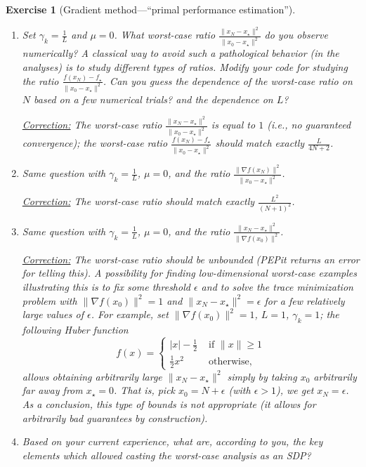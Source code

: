 \documentclass[11pt,a4paper]{article}
\newcommand{\pepit}{{PEPit }}
\newcommand{\correction}[1]{{{\color{blue}\underline{Correction:} #1}}}
\newcommand{\correction}[1]{}
\newtheorem{exercise}{Exercise}
\begin{document}
\begin{exercise}[Gradient method---``primal performance estimation'']
\begin{enumerate}
	\item Set $\gamma_k=\tfrac{1}{L}$ and $\mu=0$. What worst-case ratio $\frac{\|x_{N}-x_\star\|^2}{\|x_0-x_\star\|^2}$ do you observe numerically? A classical way to avoid such a pathological behavior  (in the analyses) is to study different types of ratios. Modify your code for studying the ratio $\frac{f(x_N)-f_\star}{\|x_0-x_\star\|^2}$. Can you guess the dependence of the worst-case ratio on $N$ based on a few numerical trials? and the dependence on $L$?
	
	\correction{The worst-case ratio $\frac{\|x_{N}-x_\star\|^2}{\|x_0-x_\star\|^2}$ is equal to $1$ (i.e., no guaranteed convergence); the worst-case ratio $\frac{f(x_N)-f_\star}{\|x_0-x_\star\|^2}$ should match exactly $\frac{L}{4N+2}$.}
	
	
	\item Same question with $\gamma_k=\tfrac{1}{L}$, $\mu=0$, and the ratio $\frac{\|\nabla f(x_N)\|^2}{\|x_0-x_\star\|^2}$.
	
	\correction{The worst-case ratio should match exactly $\frac{L^2}{(N+1)^2}$.}
	
	\item Same question with $\gamma_k=\tfrac{1}{L}$, $\mu=0$, and the ratio $\frac{\|x_N-x_\star\|^2}{\|\nabla f(x_0)\|^2}$.
	
	\correction{The worst-case ratio should be unbounded (\pepit returns an error for telling this). A possibility for finding low-dimensional worst-case examples illustrating this is to fix some threshold $\epsilon$ and to solve the trace minimization problem with $\|\nabla f(x_0)\|^2=1$ and $\|x_N-x_\star\|^2=\epsilon$ for a few relatively large values of $\epsilon$. For example, set $\|\nabla f(x_0)\|^2=1$, $L=1$, $\gamma_k=1$; the following Huber function
\begin{equation}
f(x)=\left\{\begin{array}{ll}
|x| - \tfrac{1}{2} & \text{ if } \|x\|\geqslant 1\\
\tfrac{1}{2}x^2 & \text{ otherwise, }
\end{array}\right.
\end{equation}	
allows obtaining arbitrarily large $\|x_N-x_\star\|^2$ simply by taking $x_0$ arbitrarily far away from $x_\star=0$. That is, pick $x_0=N+\epsilon$ (with $\epsilon>1$), we get $x_N=\epsilon$. As a conclusion, this type of bounds is not appropriate (it allows for arbitrarily bad guarantees by construction).}
	
	\item Based on your current experience, what are, according to you, the key elements which allowed casting the worst-case analysis as an SDP?
	

\end{enumerate}
\end{exercise}
\end{document}
